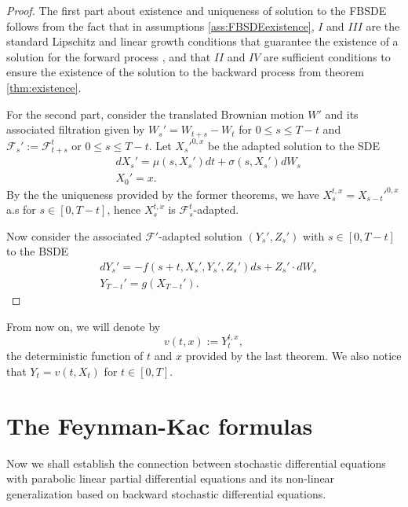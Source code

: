 \begin{proof}
	The first part about existence and uniqueness of solution to the FBSDE follows from the fact that in assumptions \ref{ass:FBSDEexistence}, $I$ and $III$ are the standard Lipschitz and linear growth conditions that guarantee the existence of a solution for the forward process \cite{mao_stochastic_2008}, and that $II$ and $IV$ are sufficient conditions to ensure the existence of the solution to the backward process from theorem \ref{thm:existence}.
	
	For the second part, consider the translated Brownian motion $W'$ and its associated filtration given by $W_s'=W_{t+s}-W_t$ for $0\leq s\leq T-t$ and $\mathcal{F}_s':=\mathcal{F}_{t+s}^t$ or $0\leq s\leq T-t$. Let $X_s'^{0,x}$ be the adapted solution to the SDE
	\begin{equation}
		\begin{split}
			&dX_s'=\mu(s,X_s')dt+\sigma(s,X_s')dW_s\\
			&X_0'=x.
		\end{split}
	\end{equation}
	By the the uniqueness provided by the former theorems, we have $X_s^{t,x}=X_{s-t}'^{0,x}$ a.s for $s\in[0,T-t]$, hence $X_s^{t,x}$ is $\mathcal{F}_{s}^{t}$-adapted.
	
	Now consider the associated $\mathcal{F}'$-adapted solution $(Y_s',Z_s')$ with $s\in[0,T-t]$ to the BSDE
	\begin{equation}
		\begin{split}
			&dY_s'=-f(s+t,X_s',Y_s',Z_s')ds+Z_s'\cdot dW_s \\
			&Y_{T-t}'=g(X_{T-t}').
		\end{split}
	\end{equation}


\end{proof}
From now on, we will denote by
\begin{equation}
	v(t,x):=Y_{t}^{t,x},
\end{equation}
the deterministic function of $t$ and $x$ provided by the last theorem. We also notice that $Y_t=v(t,X_t)$ for $t\in[0,T]$. 
\section{The Feynman-Kac formulas}
Now we shall establish the connection between stochastic differential equations with parabolic linear partial differential equations and its non-linear generalization based on backward stochastic differential equations. 
